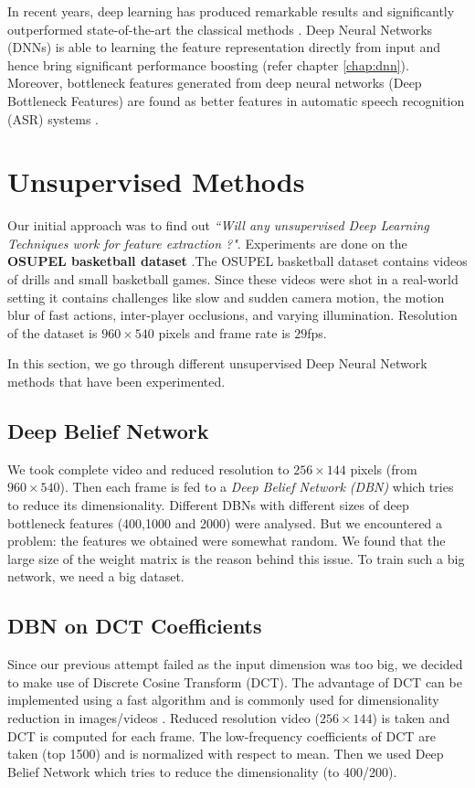 In recent years, deep learning has produced remarkable results and significantly outperformed state-of-the-art the classical methods \cite{KarpathyCVPR14}. Deep Neural Networks (DNNs) is able to learning the feature representation directly from input and hence bring significant performance boosting (refer chapter \ref{chap:dnn}). Moreover, bottleneck features generated from deep neural networks (Deep Bottleneck Features) are found as better features in automatic speech recognition (ASR) systems \cite{yu2011improved,gehring2013extracting}.

\section{Unsupervised Methods}
\label{sec:event:unsupervised}
Our initial approach was to find out \textit{``Will any unsupervised Deep Learning Techniques work for feature extraction ?"}. Experiments are done on the \textbf{OSUPEL basketball dataset} \cite{brendel2011probabilistic}.The OSUPEL basketball dataset contains videos of drills and small basketball games. Since these videos were shot in a real-world setting it contains challenges like slow and sudden camera motion, the motion blur of fast actions, inter-player occlusions, and varying illumination. Resolution of the dataset is $960 \times 540$ pixels and frame rate is $29$fps.

In this section, we go through different unsupervised Deep Neural Network methods that have been experimented. 

\subsection{Deep Belief Network} 
We took complete video and reduced resolution to $256 \times 144$ pixels (from $960 \times 540$). Then each frame is fed to a \textit{Deep Belief Network (DBN)} which tries to reduce its dimensionality. Different DBNs with different sizes of deep bottleneck features (400,1000 and 2000) were analysed. But we encountered a problem: the features we obtained were somewhat random. We found that the large size of the weight matrix is the reason behind this issue. To train such a big network, we need a big dataset.

\subsection{DBN on DCT Coefficients}
Since our previous attempt failed as the input dimension was too big, we decided to make use of Discrete Cosine Transform (DCT). The advantage of DCT can be implemented using a fast algorithm and is commonly used for dimensionality reduction in images/videos \cite{er2005high}. Reduced resolution video ($256 \times 144$) is taken and DCT is computed for each frame. The low-frequency coefficients of DCT are taken (top 1500) and is normalized with respect to mean. Then we used Deep Belief Network which tries to reduce the dimensionality (to 400/200).

